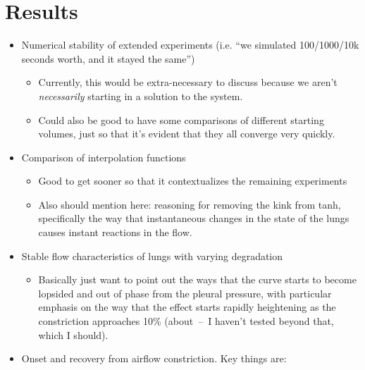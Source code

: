 %
\section{Results} \label{sec:results}


\begin{itemize}
    \item Numerical stability of extended experiments (i.e. ``we simulated 100/1000/10k seconds
        worth, and it stayed the same'')
        \begin{itemize}
            \item Currently, this would be extra-necessary to discuss because we aren't
                \textit{necessarily} starting in a solution to the system.
            \item Could also be good to have some comparisons of different starting volumes,
                just so that it's evident that they all converge very quickly.
        \end{itemize}
    \item Comparison of interpolation functions
        \begin{itemize}
            \item Good to get sooner so that it contextualizes the remaining experiments
            \item Also should mention here: reasoning for removing the kink from tanh,
                specifically the way that instantaneous changes in the state of the lungs causes
                instant reactions in the flow.
        \end{itemize}
    \item Stable flow characteristics of lungs with varying degradation
        \begin{itemize}
            \item Basically just want to point out the ways that the curve starts to become
                lopsided and out of phase from the pleural pressure, with particular emphasis on
                the way that the effect starts rapidly heightening as the constriction
                approaches 10\% (about~--~I haven't tested beyond that, which I should).
        \end{itemize}
    \item Onset and recovery from airflow constriction. Key things are:

\end{itemize}
